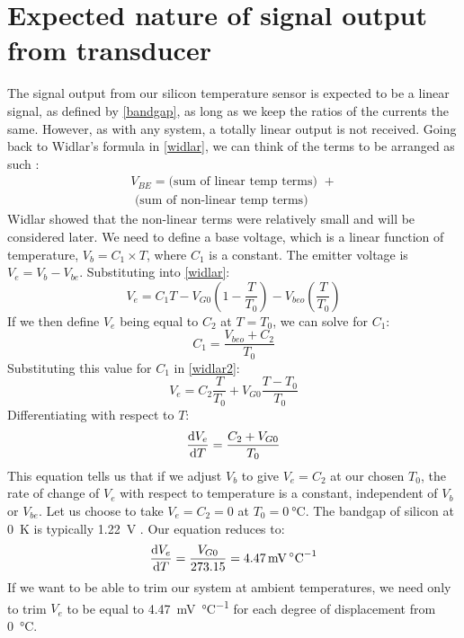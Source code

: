 \documentclass[conference]{IEEEtran}
\begin{document}
\section{Expected nature of signal output from transducer}
The signal output from our silicon temperature sensor is expected to be a linear signal, as defined by \eqref{bandgap}, as long as we keep the ratios of the currents the same. However, as with any system, a totally linear output is not received. Going back to Widlar's formula in \eqref{widlar}, we can think of the terms to be arranged as such \cite{b7} \cite{b8}:
\begin{multline}
    V_{BE} = \textrm{(sum of linear temp terms) } + \\\textrm{ (sum of non-linear temp terms)}
\end{multline}
Widlar showed that the non-linear terms were relatively small and will be considered later. We need to define a base voltage, which is a linear function of temperature, $V_b = C_1 \times T$, where $C_1$ is a constant. The emitter voltage is $V_e = V_b - V_{be}$. Substituting into \eqref{widlar}:
\begin{equation}
    V_e = C_1 T - V_{G0} \left(1 - \frac{T}{T_0}\right) - V_{beo}\left(\frac{T}{T_0}\right) \label{widlar2}
\end{equation}
If we then define $V_e$ being equal to $C_2$ at $T=T_0$, we can solve for $C_1$:
\begin{equation}
    C_1 = \frac{V_{beo} + C_2}{T_0}
\end{equation} 
Substituting this value for $C_1$ in \eqref{widlar2}:
\begin{equation}
    V_e = C_2 \frac{T}{T_0} + V_{G0} \frac{T-T_0}{T_0}
\end{equation}
Differentiating with respect to $T$: 
\begin{equation}
    \frac{\dif V_e}{\dif T} = \frac{C_2 + V_{G0}}{T_0}
\end{equation}
This equation tells us that if we adjust $V_b$ to give $V_e = C_2$ at our chosen $T_0$, the rate of change of $V_e$ with respect to temperature is a constant, independent of $V_b$ or $V_{be}$. Let us choose to take $V_e = C_2 = 0$ at $T_0 = \SI{0}{\celsius}$. The bandgap of silicon at \SI{0}{\kelvin} is typically \SI{1.22}{\volt} \cite{b8}. Our equation reduces to:
\begin{equation}
    \frac{\dif V_e}{\dif T} = \frac{V_{G0}}{273.15} = \SI{4.47}{\milli\volt\per\celsius}
\end{equation}
If we want to be able to trim our system at ambient temperatures, we need only to trim $V_e$ to be equal to \SI{4.47}{\milli\volt\per\celsius} for each degree of displacement from \SI{0}{\celsius}.
\end{document}
